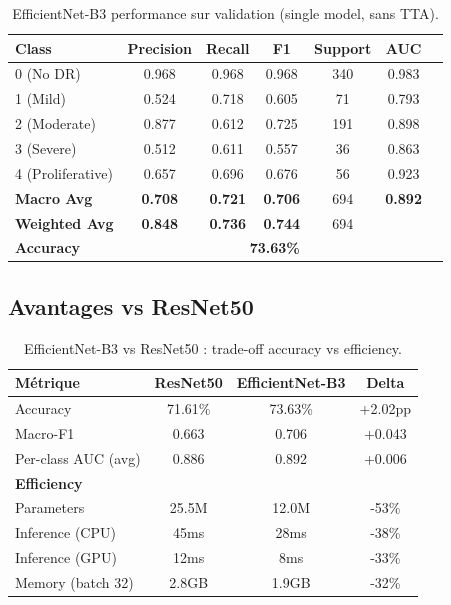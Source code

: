 \documentclass[12pt,a4paper,oneside]{report}
\begin{document}
\begin{table}[H]
\centering
\begin{tabular}{|l|c|c|c|c|c|c|}
\hline
\textbf{Class} & \textbf{Precision} & \textbf{Recall} & 
\textbf{F1} & \textbf{Support} & \textbf{AUC} \\
\hline
0 (No DR) & 0.968 & 0.968 & 0.968 & 340 & 0.983 \\
1 (Mild) & 0.524 & 0.718 & 0.605 & 71 & 0.793 \\
2 (Moderate) & 0.877 & 0.612 & 0.725 & 191 & 0.898 \\
3 (Severe) & 0.512 & 0.611 & 0.557 & 36 & 0.863 \\
4 (Proliferative) & 0.657 & 0.696 & 0.676 & 56 & 0.923 \\
\hline
\textbf{Macro Avg} & \textbf{0.708} & \textbf{0.721} & \textbf{0.706} & 
694 & \textbf{0.892} \\
\textbf{Weighted Avg} & \textbf{0.848} & \textbf{0.736} & \textbf{0.744} 
& 694 & \\
\hline
\textbf{Accuracy} & \multicolumn{5}{c|}{\textbf{73.63\%}} \\
\hline
\end{tabular}
\caption{EfficientNet-B3 performance sur validation 
(single model, sans TTA).}
\label{tab:effnet_performance}
\end{table}

\subsection{Avantages vs ResNet50}

\begin{table}[H]
\centering
\begin{tabular}{|l|c|c|c|}
\hline
\textbf{Métrique} & \textbf{ResNet50} & \textbf{EfficientNet-B3} & 
\textbf{Delta} \\
\hline
Accuracy & 71.61\% & 73.63\% & +2.02pp \\
Macro-F1 & 0.663 & 0.706 & +0.043 \\
Per-class AUC (avg) & 0.886 & 0.892 & +0.006 \\
\hline
\textbf{Efficiency} & & & \\
\hline
Parameters & 25.5M & 12.0M & -53\% \\
Inference (CPU) & 45ms & 28ms & -38\% \\
Inference (GPU) & 12ms & 8ms & -33\% \\
Memory (batch 32) & 2.8GB & 1.9GB & -32\% \\
\hline
\end{tabular}
\caption{EfficientNet-B3 vs ResNet50 : trade-off accuracy vs efficiency.}
\label{tab:effnet_vs_resnet}
\end{table}
\end{document}
